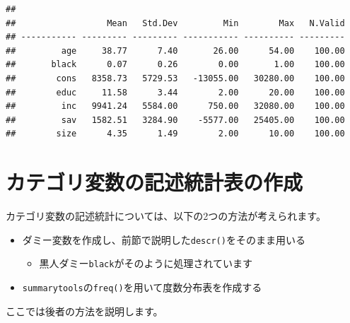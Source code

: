 \documentclass[]{book}
\newenvironment{Shaded}{\begin{snugshade}}{\end{snugshade}}
\newcommand{\KeywordTok}[1]{\textcolor[rgb]{0.13,0.29,0.53}{\textbf{#1}}}
\newcommand{\DataTypeTok}[1]{\textcolor[rgb]{0.13,0.29,0.53}{#1}}
\newcommand{\StringTok}[1]{\textcolor[rgb]{0.31,0.60,0.02}{#1}}
\newcommand{\OtherTok}[1]{\textcolor[rgb]{0.56,0.35,0.01}{#1}}
\newcommand{\OperatorTok}[1]{\textcolor[rgb]{0.81,0.36,0.00}{\textbf{#1}}}
\newcommand{\NormalTok}[1]{#1}
\providecommand{\tightlist}{%
  \setlength{\itemsep}{0pt}\setlength{\parskip}{0pt}}
\begin{document}
\begin{Shaded}
\end{Shaded}

\begin{verbatim}
## 
##                  Mean   Std.Dev         Min        Max   N.Valid
## ----------- --------- --------- ----------- ---------- ---------
##         age     38.77      7.40       26.00      54.00    100.00
##       black      0.07      0.26        0.00       1.00    100.00
##        cons   8358.73   5729.53   -13055.00   30280.00    100.00
##        educ     11.58      3.44        2.00      20.00    100.00
##         inc   9941.24   5584.00      750.00   32080.00    100.00
##         sav   1582.51   3284.90    -5577.00   25405.00    100.00
##        size      4.35      1.49        2.00      10.00    100.00
\end{verbatim}

\section{カテゴリ変数の記述統計表の作成}\label{ux30abux30c6ux30b4ux30eaux5909ux6570ux306eux8a18ux8ff0ux7d71ux8a08ux8868ux306eux4f5cux6210}

カテゴリ変数の記述統計については、以下の2つの方法が考えられます。

\begin{itemize}
\tightlist
\item
  ダミー変数を作成し、前節で説明した\texttt{descr()}をそのまま用いる

  \begin{itemize}
  \tightlist
  \item
    黒人ダミー\texttt{black}がそのように処理されています
  \end{itemize}
\item
  \texttt{summarytools}の\texttt{freq()}を用いて度数分布表を作成する
\end{itemize}

ここでは後者の方法を説明します。
\end{document}

